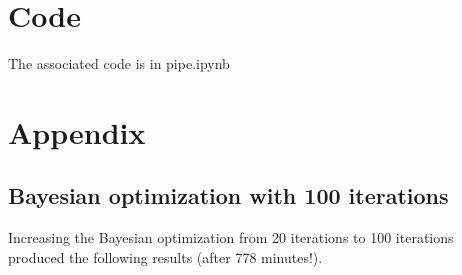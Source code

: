 \documentclass[12pt, letterpaper]{article}
\begin{document}
\section{Code} %

The associated code is in pipe.ipynb

\section{Appendix}
\subsection{Bayesian optimization with 100 iterations}

Increasing the Bayesian optimization from 20 iterations to 100 iterations produced the following results (after 778 minutes!).

\begin{table}[H]
\centering
\caption{Best pipeline values overall}
\label{best_forest_table_100}
\end{table}

\begin{table}[H]
\centering
\caption{Best pipeline values for the tree}
\label{best_tree_table_100}
\end{table}
\end{document}
